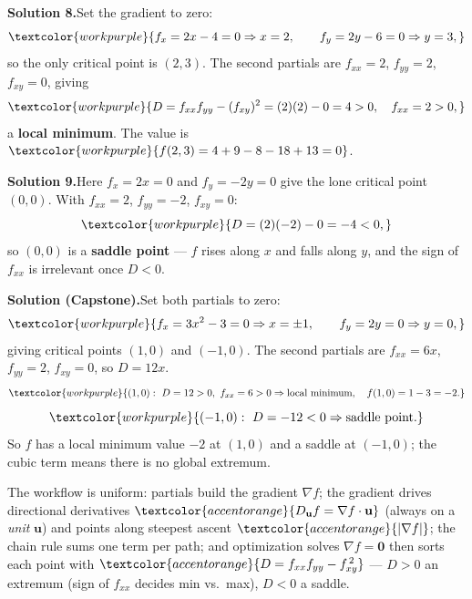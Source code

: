 \medskip
\noindent\textbf{Solution 8.}\quad Set the gradient to zero:
\[ \textcolor{workpurple}{f_x = 2x - 4 = 0 \Rightarrow x = 2,
   \qquad f_y = 2y - 6 = 0 \Rightarrow y = 3,} \]
so the only critical point is $(2,3)$. The second partials are $f_{xx}=2$,
$f_{yy}=2$, $f_{xy}=0$, giving
\[ \textcolor{workpurple}{D = f_{xx}f_{yy} - (f_{xy})^2 = (2)(2) - 0 = 4 > 0,
   \quad f_{xx} = 2 > 0,} \]
a \textbf{local minimum}. The value is
$\textcolor{workpurple}{f(2,3) = 4 + 9 - 8 - 18 + 13 = 0}$.

\medskip
\noindent\textbf{Solution 9.}\quad Here $f_x=2x=0$ and $f_y=-2y=0$ give the lone
critical point $(0,0)$. With $f_{xx}=2$, $f_{yy}=-2$, $f_{xy}=0$:
\[ \textcolor{workpurple}{D = (2)(-2) - 0 = -4 < 0,} \]
so $(0,0)$ is a \textbf{saddle point} --- $f$ rises along $x$ and falls along
$y$, and the sign of $f_{xx}$ is irrelevant once $D<0$.

\medskip
\noindent\textbf{Solution (Capstone).}\quad Set both partials to zero:
\[ \textcolor{workpurple}{f_x = 3x^2 - 3 = 0 \Rightarrow x = \pm 1,
   \qquad f_y = 2y = 0 \Rightarrow y = 0,} \]
giving critical points $(1,0)$ and $(-1,0)$. The second partials are
$f_{xx}=6x$, $f_{yy}=2$, $f_{xy}=0$, so $D=12x$.
\[ \textcolor{workpurple}{(1,0):\ D = 12 > 0,\ f_{xx} = 6 > 0
   \Rightarrow \text{local minimum},\quad f(1,0) = 1 - 3 = -2.} \]
\[ \textcolor{workpurple}{(-1,0):\ D = -12 < 0
   \Rightarrow \text{saddle point}.} \]
So $f$ has a local minimum value $-2$ at $(1,0)$ and a saddle at $(-1,0)$; the
cubic term means there is no global extremum.

\vspace{0.8em}
\begin{conceptbox}
The workflow is uniform: \textcolor{accentorange}{partials} build the
\textcolor{accentorange}{gradient $\nabla f$}; the gradient drives directional
derivatives $\textcolor{accentorange}{D_{\mathbf u}f=\nabla f\cdot\mathbf u}$
(always on a \emph{unit} $\mathbf u$) and points along steepest ascent
$\textcolor{accentorange}{\lvert\nabla f\rvert}$; the
\textcolor{accentorange}{chain rule} sums one term per path; and
\textcolor{accentorange}{optimization} solves $\nabla f=\mathbf 0$ then sorts each
point with $\textcolor{accentorange}{D=f_{xx}f_{yy}-f_{xy}^{\,2}}$ --- $D>0$ an
extremum (sign of $f_{xx}$ decides min vs.\ max), $D<0$ a saddle.
\end{conceptbox}


